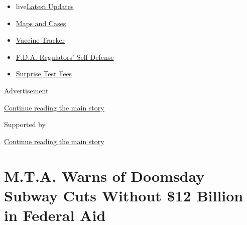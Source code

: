 \begin{itemize}
\tightlist
\item
  live\href{https://www.nytimes3xbfgragh.onion/2020/09/11/world/covid-19-coronavirus.html?name=styln-coronavirus-national\&region=TOP_BANNER\&block=storyline_menu_recirc\&action=click\&pgtype=Article\&impression_id=ab260d31-f4bf-11ea-946f-8d50c943ff29\&variant=undefined}{Latest
  Updates}
\item
  \href{https://www.nytimes3xbfgragh.onion/interactive/2020/us/coronavirus-us-cases.html?name=styln-coronavirus-national\&region=TOP_BANNER\&block=storyline_menu_recirc\&action=click\&pgtype=Article\&impression_id=ab263440-f4bf-11ea-946f-8d50c943ff29\&variant=undefined}{Maps
  and Cases}
\item
  \href{https://www.nytimes3xbfgragh.onion/interactive/2020/science/coronavirus-vaccine-tracker.html?name=styln-coronavirus-national\&region=TOP_BANNER\&block=storyline_menu_recirc\&action=click\&pgtype=Article\&impression_id=ab263441-f4bf-11ea-946f-8d50c943ff29\&variant=undefined}{Vaccine
  Tracker}
\item
  \href{https://www.nytimes3xbfgragh.onion/2020/09/10/us/politics/fda-coronavirus-vaccine.html?name=styln-coronavirus-national\&region=TOP_BANNER\&block=storyline_menu_recirc\&action=click\&pgtype=Article\&impression_id=ab263442-f4bf-11ea-946f-8d50c943ff29\&variant=undefined}{F.D.A.
  Regulators' Self-Defense}
\item
  \href{https://www.nytimes3xbfgragh.onion/2020/09/09/upshot/coronavirus-surprise-test-fees.html?name=styln-coronavirus-national\&region=TOP_BANNER\&block=storyline_menu_recirc\&action=click\&pgtype=Article\&impression_id=ab263443-f4bf-11ea-946f-8d50c943ff29\&variant=undefined}{Surprise
  Test Fees}
\end{itemize}

Advertisement

\protect\hyperlink{after-top}{Continue reading the main story}

Supported by

\protect\hyperlink{after-sponsor}{Continue reading the main story}

\hypertarget{mta-warns-of-doomsday-subway-cuts-without-12-billion-in-federal-aid}{%
\section{M.T.A. Warns of Doomsday Subway Cuts Without \$12 Billion in
Federal
Aid}\label{mta-warns-of-doomsday-subway-cuts-without-12-billion-in-federal-aid}}

